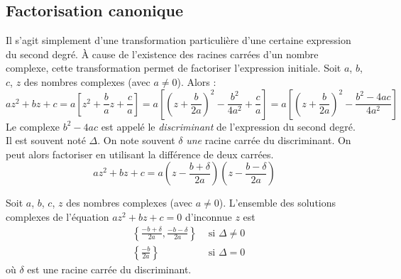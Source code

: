 \subsection{Factorisation canonique}
Il s'agit simplement d'une transformation particulière d'une certaine expression du second degré. \`A cause de l'existence des racines carrées d'un nombre complexe, cette transformation permet de factoriser l'expression initiale.\newline
Soit $a$, $b$, $c$, $z$ des nombres complexes (avec $a\neq 0$). Alors :
\begin{displaymath}
 az^2+bz+c = a \left[ z^2 + \frac{b}{a}z + \frac{c}{a} \right]
 =  a \left[ \left( z+\frac{b}{2a}\right)^2 - \frac{b^2}{4a^2}+\frac{c}{a} \right]
= a \left[ \left( z+\frac{b}{2a}\right)^2 - \frac{b^2-4ac}{4a^2} \right]
\end{displaymath}
Le complexe $b^2-4ac$ est appelé le \emph{discriminant}  de l'expression du second degré. Il est souvent noté $\Delta$. On note souvent $\delta$ \emph{une} racine carrée du discriminant. On peut alors factoriser en utilisant la différence de deux carrées.
\begin{displaymath}
 az^2+bz+c = a\left( z- \frac{b+\delta}{2a}\right)\left( z- \frac{b-\delta}{2a}\right) 
\end{displaymath}
\begin{prop}
Soit $a$, $b$, $c$, $z$ des nombres complexes (avec $a\neq 0$). L'ensemble des solutions complexes de l'équation $az^2+bz+c=0$ d'inconnue $z$ est
\begin{displaymath}
\left. 
\begin{aligned}
&\left\lbrace \frac{-b+\delta}{2a},\frac{-b-\delta}{2a}\right\rbrace & \text{ si } \Delta \neq 0 \\ 
&\left\lbrace \frac{-b}{2a}\right\rbrace & \text{ si } \Delta = 0 
\end{aligned}
\right.
\end{displaymath}
 où $\delta$ est une racine carrée du discriminant.
\end{prop}
